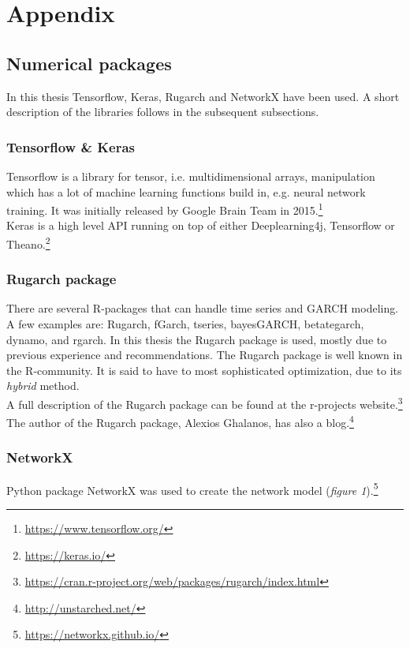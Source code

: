 \documentclass[12pt, letterpaper]{amsart}%
\begin{document}
\newpage

\section{Appendix}

\subsection{Numerical packages}
In this thesis Tensorflow, Keras, Rugarch and NetworkX have been used. A short description of the libraries follows in the subsequent subsections.

\subsubsection{Tensorflow \& Keras}
Tensorflow is a library for tensor, i.e. multidimensional arrays, manipulation which has a lot of machine learning functions build in, e.g. neural network training. It was initially released by Google Brain Team in 2015.\footnote{\url{https://www.tensorflow.org/}}
\\

Keras is a high level API running on top of either Deeplearning4j, Tensorflow or Theano.\footnote{\url{https://keras.io/}}

\subsubsection{Rugarch package}
There are several R-packages that can handle time series and GARCH modeling. A few examples are: Rugarch, fGarch, tseries, bayesGARCH, betategarch, dynamo, and rgarch. In this thesis the Rugarch package is used, mostly due to previous experience and recommendations. The Rugarch package is well known in the R-community. It is said to have to most sophisticated optimization, due to its \textit{hybrid} method.
\\

A full description of the Rugarch package can be found at the r-projects website.\footnote{\url{https://cran.r-project.org/web/packages/rugarch/index.html}}
\\

The author of the Rugarch package, Alexios Ghalanos, has also a blog.\footnote{\url{http://unstarched.net/}}

\subsubsection{NetworkX}
Python package NetworkX was used to create the network model (\textit{figure 1}).\footnote{\url{https://networkx.github.io/}}
\end{document}
